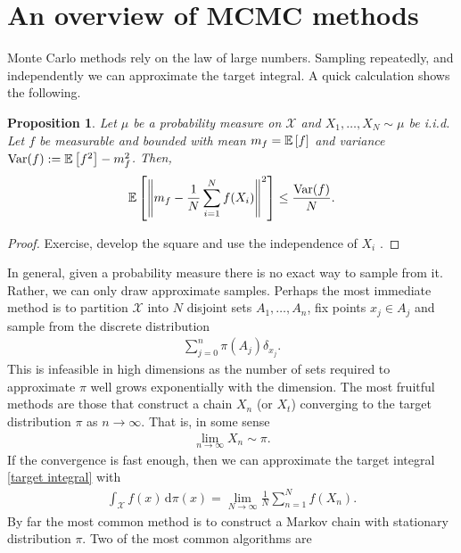\documentclass[
    a4paper,
    DIV=14,
    abstract=true,
    numbers=noenddot
]
{scrartcl}
\newtheorem{proposition}[theorem]{Proposition}
\theoremstyle{definition}
\renewcommand{\norm}[1]{\left\lVert #1 \right\rVert}\renewcommand{\abs}[1]{\left| #1 \right|}
\renewcommand{\d}{\,\mathrm{d}}\newcommand{\dx}{\,\mathrm{d}x}
\newcommand{\rmm}[1]{\mathrm{#1}}
\newcommand{\E}{\mathbb{E}}
\newcommand{\Xx}{\mathcal{X}}
\begin{document}
\section{An overview of MCMC methods}
Monte Carlo methods rely on the law of large numbers. Sampling repeatedly, and independently we can approximate the target integral.  A quick calculation shows the following.

\begin{proposition}
Let $\mu$ be a probability measure on $\Xx $ and $X_1, \ldots, X_N\sim \mu$ be i.i.d. Let $f$ be measurable and bounded with mean $m_f = \E\qb{f} $ and variance $\rmm{Var}(f):= \E\qb{f^2} - m_f^2$. Then, 
\begin{align*}
    \E\qb{\norm{m_f -\frac{1}{N}\sum_{i=1}^N f(X_i)}^2} \leq \frac{\rmm{Var}(f)}{N}.
\end{align*}
\end{proposition}
\begin{proof}
    Exercise, develop the square and use the independence of $X_i$ .
\end{proof}
In general, given a probability measure there is no exact way to sample from it. Rather, we can only draw approximate samples. Perhaps the most immediate method is to partition $\mathcal{X}$ into $N$ disjoint sets $A_1, \ldots, A_n$, fix points $x_j \in A_j$ and sample from the discrete distribution
\begin{align*}
    \sum_{j=0}^{n}  \pi(A_j) \delta_{x_j}.
\end{align*}
This is infeasible in high dimensions as the number of sets required to approximate $\pi$ well grows exponentially with the dimension. The most fruitful methods are those that construct a chain $X_n$ (or $X_t$) converging to the target distribution $\pi$ as $n \to \infty$. That is, in some sense
\begin{align*}
\lim_{n \to \infty} X_n \sim \pi.
\end{align*}
If the convergence is fast enough, then we can approximate the target integral \eqref{target integral} with
 \begin{align*}
     \int_{\Xx}f(x) \d \pi (x)= \lim_{N \to \infty} \frac{1}{N} \sum_{n=1}^N { f(X_n)}.
 \end{align*}
 By far the most common method is to construct a Markov chain with stationary distribution $\pi$. Two of the most common algorithms are
\end{document}
